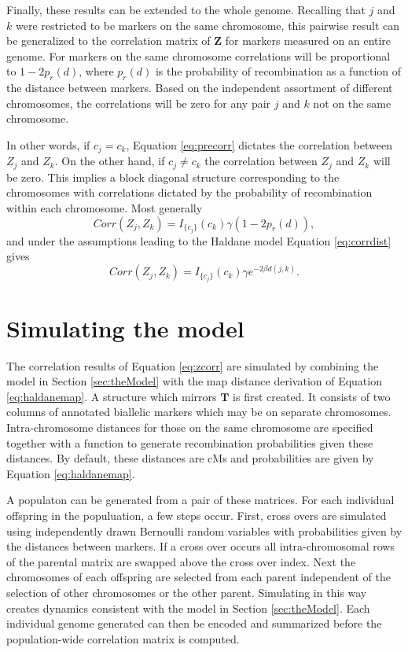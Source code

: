 \documentclass[sts]{imsart}
\newcommand{\ve}[1]{\mathbf{#1}}           %
\newcommand{\m}[1]{\mathbf{#1}}               %
\newcommand{\ind}[2]{I_{#2} \left( #1 \right)}
\begin{document}
Finally, these results can be extended to the whole genome. Recalling that $j$ and $k$ were restricted to be markers on the same chromosome, this pairwise result can be generalized to the correlation matrix of $\ve{Z}$ for markers measured on an entire genome. For markers on the same chromosome correlations will be proportional to $1 - 2p_r(d)$, where $p_r(d)$ is the probability of recombination as a function of the distance between markers. Based on the independent assortment of different chromosomes, the correlations will be zero for any pair $j$ and $k$ not on the same chromosome.

In other words, if $c_j = c_k$, Equation \ref{eq:precorr} dictates the correlation between $Z_j$ and $Z_k$. On the other hand, if $c_j \neq c_k$ the correlation between $Z_j$ and $Z_k$ will be zero. This implies a block diagonal structure corresponding to the chromosomes with correlations dictated by the probability of recombination within each chromosome. Most generally
\begin{equation} \label{eq:zcorr_gen}
  Corr(Z_j, Z_k) = \ind{c_k}{\{c_j\}} \gamma (1 - 2p_r(d)),
\end{equation}
and under the assumptions leading to the Haldane model Equation \ref{eq:corrdist} gives
\begin{equation} \label{eq:zcorr}
  Corr(Z_j, Z_k) = \ind{c_k}{\{c_j\}} \gamma e^{-2 \beta d(j,k)}.
\end{equation}

\section{Simulating the model} \label{sec:sim}

The correlation results of Equation \ref{eq:zcorr} are simulated by combining the model in Section \ref{sec:theModel} with the map distance derivation of Equation \ref{eq:haldanemap}. A structure which mirrors $\m{T}$ is first created. It consists of two columns of annotated biallelic markers which may be on separate chromosomes. Intra-chromosome distances for those on the same chromosome are specified together with a function to generate recombination probabilities given these distances. By default, these distances are cMs and probabilities are given by Equation \ref{eq:haldanemap}.

A populaton can be generated from a pair of these matrices. For each individual offspring in the populuation, a few steps occur. First, cross overs are simulated using independently drawn Bernoulli random variables with probabilities given by the distances between markers. If a cross over occurs all intra-chromosomal rows of the parental matrix are swapped above the cross over index. Next the chromosomes of each offspring are selected from each parent independent of the selection of other chromosomes or the other parent. Simulating in this way creates dynamics consistent with the model in Section \ref{sec:theModel}. Each individual genome generated can then be encoded and summarized before the population-wide correlation matrix is computed.
\end{document}
